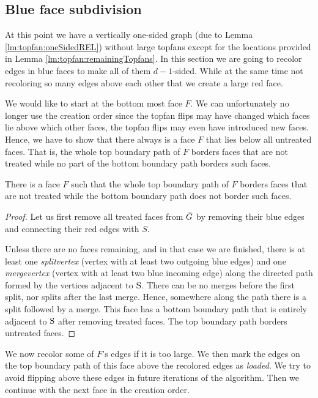 
\subsection{Blue face subdivision}
\thispagestyle{plain}
\label{ss:subdiv}
  At this point we have a vertically one-sided graph (due to Lemma \ref{lm:topfan:oneSidedREL}) without large topfans except for the locations provided in Lemma \ref{lm:topfan:remainingTopfans}.
  In this section we are going to recolor edges in blue faces to make all of them $d-1$-sided.
  While at the same time not recoloring so many edges above each other that we create a large red face.

  We would like to start at the bottom most face $F$. We can unfortunately no longer use the creation order since the topfan flips may have changed which faces lie above which other faces, the topfan flips may even have introduced new faces.
  Hence, we have to show that there always is a face $F$  that lies below all untreated faces. That is, the whole top boundary path of $F$ borders faces that are not treated while no part of the bottom boundary path borders such faces.

  \begin{lemma}
    \label{lm:}
    There is a face $F$ such that the whole top boundary path of $F$ borders faces that are not treated while the bottom boundary path does not border such faces.
  \end{lemma}
  \begin{proof}
    Let us first remove all treated faces from $\bar{G}$ by removing their blue edges and connecting their red edges with $S$.

    Unless there are no faces remaining, and in that case we are finished, there is at least one \emph{splitvertex} (vertex with at least two outgoing blue edges) and one \emph{mergevertex} (vertex with at least two blue incoming edge) along the directed path formed by the vertices adjacent to $\mathrm{S}$.
    There can be no merges before the first split, nor splits after the last merge.
    Hence, somewhere along the path there is a split followed by a merge.
    This face has a bottom boundary path that is entirely adjacent to $\mathrm{S}$ after removing treated faces.
    The top boundary path borders untreated faces.
  \end{proof}


  We now recolor some of $F$'s edges if it is too large.
  We then mark the edges on the top boundary path of this face above the recolored edges as \emph{loaded}.
  We try to avoid flipping above these edges in future iterations of the algorithm.
  Then we continue with the next face in the creation order.

